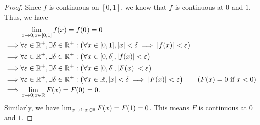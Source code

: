 \begin{proof}
  Since \(f\) is continuous on \([0, 1]\), we know that \(f\) is continuous at \(0\) and \(1\).
  Thus, we have
  \begin{align*}
             & \lim_{x \to 0 ; x \in [0, 1]} f(x) = f(0) = 0                                                                                                                             \\
    \implies & \forall \varepsilon \in \mathbb{R}^+, \exists \delta \in \mathbb{R}^+ : \big(\forall x \in [0, 1], \left\lvert x\right\rvert < \delta \implies \left\lvert f(x)\right\rvert < \varepsilon\big)                                \\
    \implies & \forall \varepsilon \in \mathbb{R}^+, \exists \delta \in \mathbb{R}^+ : \big(\forall x \in [0, \delta], \left\lvert f(x)\right\rvert < \varepsilon\big)                                                     \\
    \implies & \forall \varepsilon \in \mathbb{R}^+, \exists \delta \in \mathbb{R}^+ : \big(\forall x \in [0, \delta], \left\lvert F(x)\right\rvert < \varepsilon\big)                                                     \\
    \implies & \forall \varepsilon \in \mathbb{R}^+, \exists \delta \in \mathbb{R}^+ : \big(\forall x \in \mathbb{R}, \left\lvert x\right\rvert < \delta \implies \left\lvert F(x)\right\rvert < \varepsilon\big)     & (F(x) = 0 \text{ if } x < 0) \\
    \implies & \lim_{x \to 0 ; x \in \mathbb{R}} F(x) = F(0) = 0.
  \end{align*}
  Similarly, we have \(\lim_{x \to 1 ; x \in \mathbb{R}} F(x) = F(1) = 0\).
  This means \(F\) is continuous at \(0\) and \(1\).


\end{proof}

